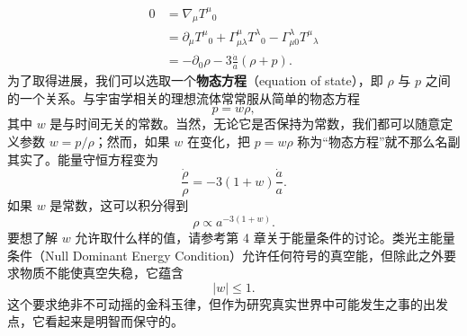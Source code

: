 \begin{equation*}
\begin{aligned}
0 &= \nabla_\mu T^\mu{}_{0}\\
&= \partial_\mu T^\mu{}_{0} + \Gamma^\mu_{\mu\lambda}T^\lambda{}_{0} - \Gamma^\lambda_{\mu 0}T^\mu{}_{\lambda}\\
&= -\partial_0\rho - 3\frac{\dot{a}}{a}\left(\rho + p\right).
\end{aligned}
\tag{8.52}
\end{equation*}
为了取得进展，我们可以选取一个\textbf{物态方程}（equation of state），即 $\rho$ 与 $p$ 之间的一个关系。与宇宙学相关的理想流体常常服从简单的物态方程
\begin{equation*}
p = w\rho,
\tag{8.53}
\end{equation*}
其中 $w$ 是与时间无关的常数。当然，无论它是否保持为常数，我们都可以随意定义参数 $w=p/\rho$；然而，如果 $w$ 在变化，把 $p=w\rho$ 称为“物态方程”就不那么名副其实了。能量守恒方程变为
\begin{equation*}
\boxed{\;\frac{\dot{\rho}}{\rho} = -3(1+w)\frac{\dot{a}}{a}.\;}
\tag{8.54}
\end{equation*}
如果 $w$ 是常数，这可以积分得到
\begin{equation*}
\rho \propto a^{-3(1+w)}.
\tag{8.55}
\end{equation*}
要想了解 $w$ 允许取什么样的值，请参考第 4 章关于能量条件的讨论。类光主能量条件（Null Dominant Energy Condition）允许任何符号的真空能，但除此之外要求物质不能使真空失稳，它蕴含
\begin{equation*}
|w| \leq 1.
\tag{8.56}
\end{equation*}
这个要求绝非不可动摇的金科玉律，但作为研究真实世界中可能发生之事的出发点，它看起来是明智而保守的。

